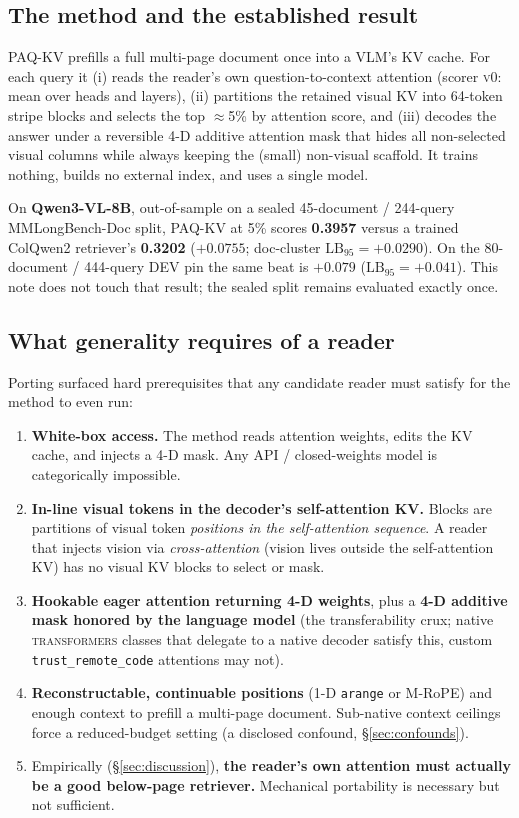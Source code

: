 \documentclass[letterpaper]{article} %
\newcommand{\paqc}{\textsc{PAQ-KV}}
\newcommand{\lb}{\mathrm{LB}_{95}}
\begin{document}
\subsection{The method and the established result}
\paqc{} prefills a full multi-page document once into a VLM's KV cache. For each query it (i) reads the reader's own
question-to-context attention (scorer \textsc{v0}: mean over heads and layers), (ii) partitions the retained visual KV
into 64-token stripe blocks and selects the top $\approx$5\% by attention score, and (iii) decodes the answer under a
reversible 4-D additive attention mask that hides all non-selected visual columns while always keeping the (small)
non-visual scaffold. It trains nothing, builds no external index, and uses a single model.

On \textbf{Qwen3-VL-8B}, out-of-sample on a sealed 45-document / 244-query MMLongBench-Doc split, \paqc{} at 5\%
scores \textbf{0.3957} versus a trained ColQwen2 retriever's \textbf{0.3202} ($+0.0755$; doc-cluster $\lb=+0.0290$).
On the 80-document / 444-query DEV pin the same beat is $+0.079$ ($\lb=+0.041$). This note does not touch that result;
the sealed split remains evaluated exactly once.

\subsection{What generality requires of a reader}
\label{sec:requires}
Porting surfaced hard prerequisites that any candidate reader must satisfy for the method to even run:
\begin{enumerate}
\item \textbf{White-box access.} The method reads attention weights, edits the KV cache, and injects a 4-D mask. Any
API / closed-weights model is categorically impossible.
\item \textbf{In-line visual tokens in the decoder's self-attention KV.} Blocks are partitions of visual token
\emph{positions in the self-attention sequence}. A reader that injects vision via \emph{cross-attention} (vision lives
outside the self-attention KV) has no visual KV blocks to select or mask.
\item \textbf{Hookable eager attention returning 4-D weights}, plus a \textbf{4-D additive mask honored by the
language model} (the transferability crux; native \textsc{transformers} classes that delegate to a native decoder
satisfy this, custom \texttt{trust\_remote\_code} attentions may not).
\item \textbf{Reconstructable, continuable positions} (1-D \texttt{arange} or M-RoPE) and enough context to prefill a
multi-page document. Sub-native context ceilings force a reduced-budget setting (a disclosed confound,
\S\ref{sec:confounds}).
\item Empirically (\S\ref{sec:discussion}), \textbf{the reader's own attention must actually be a good below-page
retriever.} Mechanical portability is necessary but not sufficient.
\end{enumerate}
\end{document}
